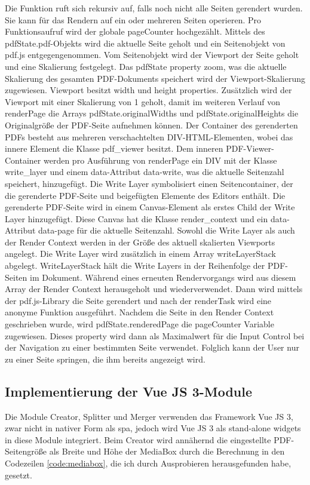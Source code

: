 Die Funktion ruft sich rekursiv auf, falls noch nicht alle Seiten gerendert wurden. Sie kann für das Rendern auf ein oder mehreren Seiten operieren. Pro Funktionsaufruf wird der globale pageCounter hochgezählt. Mittels des pdfState.pdf-Objekts wird die aktuelle Seite geholt und ein Seitenobjekt von pdf.js entgegengenommen. Vom Seitenobjekt wird der Viewport der Seite geholt und eine Skalierung festgelegt. Das pdfState property zoom, was die aktuelle Skalierung des gesamten PDF-Dokuments speichert wird der Viewport-Skalierung zugewiesen. Viewport besitzt width und height properties. Zusätzlich wird der Viewport mit einer Skalierung von 1 geholt, damit im weiteren Verlauf von renderPage die Arrays pdfState.originalWidths und pdfState.originalHeights die Originalgröße der PDF-Seite aufnehmen können. Der Container des gerenderten PDFs besteht aus mehreren verschachtelten DIV-HTML-Elementen, wobei das innere Element die Klasse pdf\_viewer besitzt. Dem inneren PDF-Viewer-Container werden pro Ausführung von renderPage ein DIV mit der Klasse write\_layer und einem data-Attribut data-write, was die aktuelle Seitenzahl speichert, hinzugefügt. Die Write Layer symbolisiert einen Seitencontainer, der die gerenderte PDF-Seite und beigefügten Elemente des Editors enthält. Die gerenderte PDF-Seite wird in einem Canvas-Element als erstes Child der Write Layer hinzugefügt. Diese Canvas hat die Klasse render\_context und ein data-Attribut data-page für die aktuelle Seitenzahl. Sowohl die Write Layer als auch der Render Context werden in der Größe des aktuell skalierten Viewports angelegt. Die Write Layer wird zusätzlich in einem Array writeLayerStack abgelegt. WriteLayerStack hält die Write Layers in der Reihenfolge der PDF-Seiten im Dokument. Während eines erneuten Rendervorgangs wird aus diesem Array der Render Context herausgeholt und wiederverwendet. Dann wird mittels der pdf.js-Library die Seite gerendert und nach der renderTask wird eine anonyme Funktion ausgeführt. Nachdem die Seite in den Render Context geschrieben wurde, wird pdfState.renderedPage die pageCounter Variable zugewiesen. Dieses property wird dann als Maximalwert für die Input Control bei der Navigation zu einer bestimmten Seite verwendet. Folglich kann der User nur zu einer Seite springen, die ihm bereits angezeigt wird. 

\subsection{Implementierung der Vue JS 3-Module}
Die Module Creator, Splitter und Merger verwenden das Framework Vue JS 3, zwar nicht in nativer Form als \gls{spa}, jedoch wird Vue JS 3 als stand-alone widgets in diese Module integriert. Beim Creator wird annähernd die eingestellte PDF-Seitengröße als Breite und Höhe der MediaBox durch die Berechnung in den Codezeilen \ref{code:mediabox}, die ich durch Ausprobieren herausgefunden habe, gesetzt.

